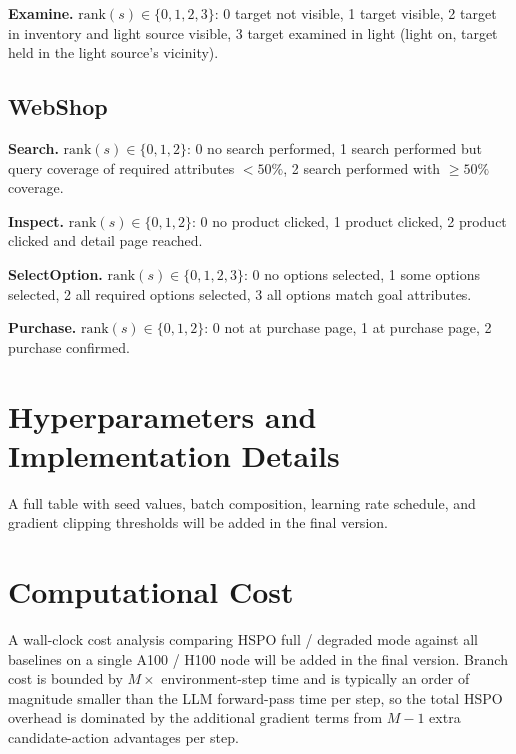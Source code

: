 \documentclass{article}
\begin{document}
\textbf{Examine.} $\mathrm{rank}(s) \in \{0, 1, 2, 3\}$: 0 target not visible, 1 target visible, 2 target in inventory and light source visible, 3 target examined in light (light on, target held in the light source's vicinity).

\subsection{WebShop}

\textbf{Search.} $\mathrm{rank}(s) \in \{0, 1, 2\}$: 0 no search performed, 1 search performed but query coverage of required attributes $< 50\%$, 2 search performed with $\geq 50\%$ coverage.

\textbf{Inspect.} $\mathrm{rank}(s) \in \{0, 1, 2\}$: 0 no product clicked, 1 product clicked, 2 product clicked and detail page reached.

\textbf{SelectOption.} $\mathrm{rank}(s) \in \{0, 1, 2, 3\}$: 0 no options selected, 1 some options selected, 2 all required options selected, 3 all options match goal attributes.

\textbf{Purchase.} $\mathrm{rank}(s) \in \{0, 1, 2\}$: 0 not at purchase page, 1 at purchase page, 2 purchase confirmed.

\section{Hyperparameters and Implementation Details}

A full table with seed values, batch composition, learning rate schedule, and gradient clipping thresholds will be added in the final version.

\section{Computational Cost}

A wall-clock cost analysis comparing HSPO full / degraded mode against all baselines on a single A100 / H100 node will be added in the final version. Branch cost is bounded by $M \times$ environment-step time and is typically an order of magnitude smaller than the LLM forward-pass time per step, so the total HSPO overhead is dominated by the additional gradient terms from $M-1$ extra candidate-action advantages per step.

\newpage

\end{document}
